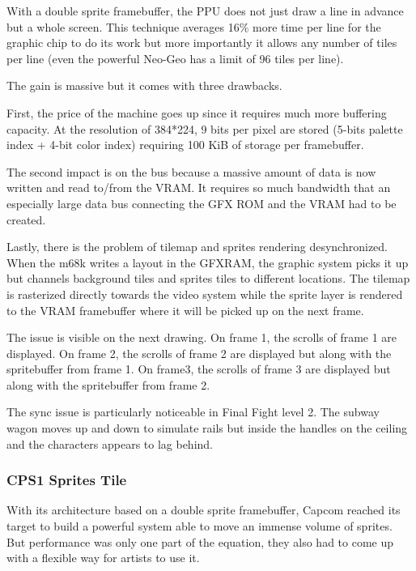 With a double sprite framebuffer, the PPU does not just draw a line in advance but a whole screen. This technique averages 16\% more time per line for the graphic chip to do its work but more importantly it allows any number of tiles per line (even the powerful Neo-Geo has a limit of 96 tiles per line).

The gain is massive but it comes with three drawbacks. 

First, the price of the machine goes up since it requires much more buffering capacity. At the resolution of 384*224, 9 bits per pixel are stored (5-bits palette index + 4-bit color index) requiring 100 KiB of storage per framebuffer.


The second impact is on the bus because a massive amount of data is now written and read to/from the VRAM. It requires so much bandwidth that an especially large data bus connecting the GFX ROM and the VRAM had to be created.

Lastly, there is the problem of tilemap and sprites rendering desynchronized. When the m68k writes a layout in the GFXRAM, the graphic system picks it up but channels background tiles and sprites tiles to different locations. The tilemap is rasterized directly towards the video system while the sprite layer is rendered to the VRAM framebuffer where it will be picked up on the next frame.
 


The issue is visible on the next drawing. On frame 1, the scrolls of frame 1 are displayed. On frame 2, the scrolls of frame 2 are displayed but along with the spritebuffer from frame 1. On frame3, the scrolls of frame 3 are displayed but along with the spritebuffer from frame 2. 


\begin{trivia}
The sync issue is particularly noticeable in Final Fight level 2. The subway wagon moves up and down to simulate rails but inside the handles on the ceiling and the characters appears to lag behind.
\end{trivia}

\subsubsection{CPS1 Sprites Tile}
With its architecture based on a double sprite framebuffer, Capcom reached its target to build a powerful system able to move an immense volume of sprites. But performance was only one part of the equation, they also had to come up with a flexible way for artists to use it.

